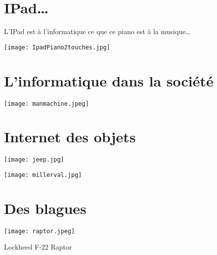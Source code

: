 \documentclass[french]{beamer}
\begin{document}
\section{IPad\ldots{}}

\begin{frame}
L'IPad est à l'informatique ce que ce piano est à la musique\ldots{}
 \begin{center}
\texttt{[image: IpadPiano2touches.jpg]}
\end{center}
\end{frame}



\section{L'informatique dans la société}

\begin{frame}
   \begin{center}
\texttt{[image: manmachine.jpeg]}
\end{center}
\end{frame}


\section{Internet des objets}


\begin{frame}
   \begin{center}
\texttt{[image: jeep.jpg]}
\end{center}
\end{frame}



\begin{frame}
   \begin{center}
\texttt{[image: millerval.jpg]}
\end{center}
\end{frame}



\section{Des blagues}




\begin{frame}
   \begin{center}
     \texttt{[image: raptor.jpeg]}
     \caption{Lockheed F-22 Raptor}
\end{center}
\end{frame}
\end{document}
